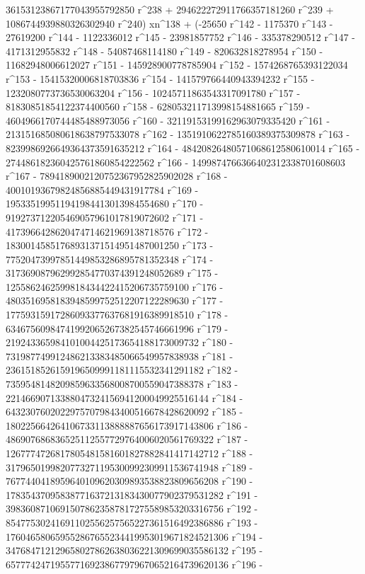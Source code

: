        36153123867177043955792850 r^238 + 
       294622272911766357181260 r^239 + 
       1086744939880326302940 r^240) xn^138 + (-25650 r^142 - 
       1175370 r^143 - 27619200 r^144 - 1122336012 r^145 - 
       23981857752 r^146 - 335378290512 r^147 - 4171312955832 r^148 - 
       54087468114180 r^149 - 820632818278954 r^150 - 
       11682948006612027 r^151 - 145928900778785904 r^152 - 
       1574268765393122034 r^153 - 15415320006818703836 r^154 - 
       141579766440943394232 r^155 - 1232080773736530063204 r^156 - 
       10245711863543317091780 r^157 - 
       81830851854122374400560 r^158 - 
       628053211713998154881665 r^159 - 
       4604966170744485488973056 r^160 - 
       32119153199162963079335420 r^161 - 
       213151685080618638797533078 r^162 - 
       1351910622785160389375309878 r^163 - 
       8239986926649364373591635212 r^164 - 
       48420826480571068612580610014 r^165 - 
       274486182360425761860854222562 r^166 - 
       1499874766366402312338701608603 r^167 - 
       7894189002120752367952825902028 r^168 - 
       40010193679824856885449431917784 r^169 - 
       195335199511941984413013984554680 r^170 - 
       919273712205469057961017819072602 r^171 - 
       4173966428620474714621969138718576 r^172 - 
       18300145851768931371514951487001250 r^173 - 
       77520473997851449853286895781352348 r^174 - 
       317369087962992854770374391248052689 r^175 - 
       1255862462599818434422415206735759100 r^176 - 
       4803516958183948599752512207122289630 r^177 - 
       17759315917286093377637681916389918510 r^178 - 
       63467560984741992065267382545746661996 r^179 - 
       219243365984101004425173654188173009732 r^180 - 
       731987749912486213383485066549957838938 r^181 - 
       2361518526159196509991181115532341291182 r^182 - 
       7359548148209859633568008700559047388378 r^183 - 
       22146690713388047324156941200049925516144 r^184 - 
       64323076020229757079843400516678428620092 r^185 - 
       180225664264106733113888887656173917143806 r^186 - 
       486907686836525112557729764006020561769322 r^187 - 
       1267774726817805481581601827882841417142712 r^188 - 
       3179650199820773271195300992309911536741948 r^189 - 
       7677440418959640109620309893538823809656208 r^190 - 
       17835437095838771637213183430077902379531282 r^191 - 
       39836087106915078623587817275589853203316756 r^192 - 
       85477530241691102556257565227361516492386886 r^193 - 
       176046580659552867655234419953019671824521306 r^194 - 
       347684712129658027862638036221309699035586132 r^195 - 
       657774247195577169238677979670652164739620136 r^196 - 
